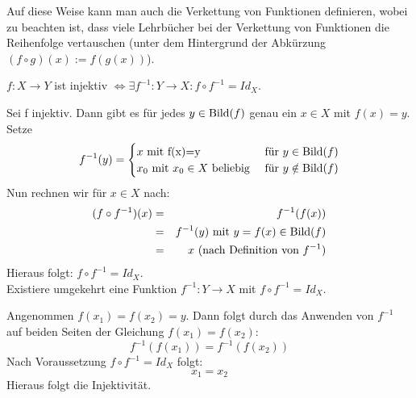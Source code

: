 \documentclass[10pt]{scrbook}
\begin{document}
\begin{Bem}
Auf diese Weise kann man auch die Verkettung von Funktionen definieren, wobei zu beachten ist, dass viele Lehrbücher bei der Verkettung von Funktionen die Reihenfolge vertauschen (unter dem Hintergrund der Abkürzung $(f \circ g)(x):=f(g(x))$).
\end{Bem}

\begin{Le}
$f: X\rightarrow Y$ ist injektiv $\Leftrightarrow \exists f^{-1}: Y \rightarrow X: f\circ f^{-1}=Id_X$. 
\end{Le}
\begin{bew}
Sei f injektiv. Dann gibt es für jedes $y\in \operatorname{Bild}(f)$ genau ein $x\in X$ mit $f(x)=y$. Setze
\begin{displaymath}
f^{-1}(y)=
\begin{cases}
x \textnormal{ mit f(x)=y } & \textnormal{für }y\in \operatorname{Bild}(f)\\
x_0\textnormal{ mit }x_0\in X\textnormal{ beliebig }&\textnormal{für }y\notin \operatorname{Bild}(f)\\
\end{cases}
\end{displaymath}
Nun rechnen wir für $x\in X$ nach:
\begin{eqnarray*}
	(f\circ f^{-1})(x) & = & f^{-1}(f(x)) \\
	& = & f^{-1}(y)\textnormal{ mit }y=f(x)\in \operatorname{Bild}(f) \\
	& = & x\textnormal{ (nach Definition von }f^{-1}\textnormal{)}
\end{eqnarray*}
Hieraus folgt: $f\circ f^{-1}=Id_X$.\\

Existiere umgekehrt eine Funktion $f^{-1}: Y \rightarrow X$ mit $f\circ f^{-1}=Id_X$.

Angenommen $f(x_1)=f(x_2)=y$. Dann folgt durch das Anwenden von $f^{-1}$ auf beiden Seiten der Gleichung $f(x_1)=f(x_2)$:
\begin{displaymath}
f^{-1}(f(x_1))=f^{-1}(f(x_2))
\end{displaymath}
Nach Voraussetzung $f\circ f^{-1}=Id_X$ folgt:
\begin{displaymath}
x_1=x_2
\end{displaymath}
Hieraus folgt die Injektivität.
\end{bew}
\end{document}
